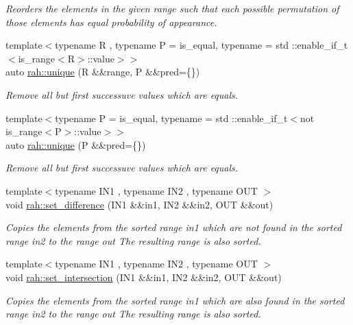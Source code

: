 \begin{DoxyCompactItemize}
\begin{DoxyCompactList}\small\item\em Reorders the elements in the given range such that each possible permutation of those elements has equal probability of appearance. \end{DoxyCompactList}\item 
{\footnotesize template$<$typename R , typename P  = is\+\_\+equal, typename  = std \+::enable\+\_\+if\+\_\+t$<$is\+\_\+range$<$\+R$>$\+::value$>$$>$ }\\auto \mbox{\hyperlink{namespacerah_a7c4f0afb068c908600b357e111148df7}{rah\+::unique}} (R \&\&range, P \&\&pred=\{\})
\begin{DoxyCompactList}\small\item\em Remove all but first successuve values which are equals. \end{DoxyCompactList}\item 
{\footnotesize template$<$typename P  = is\+\_\+equal, typename  = std \+::enable\+\_\+if\+\_\+t$<$not is\+\_\+range$<$\+P$>$\+::value$>$$>$ }\\auto \mbox{\hyperlink{namespacerah_aafbbb6f9bd014675985d33d93221acca}{rah\+::unique}} (P \&\&pred=\{\})
\begin{DoxyCompactList}\small\item\em Remove all but first successuve values which are equals. \end{DoxyCompactList}\item 
{\footnotesize template$<$typename I\+N1 , typename I\+N2 , typename O\+UT $>$ }\\void \mbox{\hyperlink{namespacerah_aca8dbcc943f7c503acea5f58f231a5af}{rah\+::set\+\_\+difference}} (I\+N1 \&\&in1, I\+N2 \&\&in2, O\+UT \&\&out)
\begin{DoxyCompactList}\small\item\em Copies the elements from the sorted range in1 which are not found in the sorted range in2 to the range out The resulting range is also sorted. \end{DoxyCompactList}\item 
{\footnotesize template$<$typename I\+N1 , typename I\+N2 , typename O\+UT $>$ }\\void \mbox{\hyperlink{namespacerah_a41cb09a0285e2a6814b8aa99f90ba987}{rah\+::set\+\_\+intersection}} (I\+N1 \&\&in1, I\+N2 \&\&in2, O\+UT \&\&out)
\begin{DoxyCompactList}\small\item\em Copies the elements from the sorted range in1 which are also found in the sorted range in2 to the range out The resulting range is also sorted. \end{DoxyCompactList}\item 

\end{DoxyCompactItemize}
